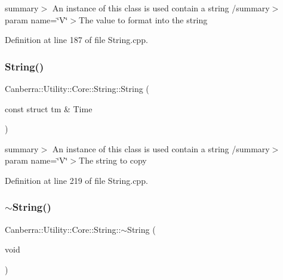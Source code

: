 summary$>$ An instance of this class is used contain a string /summary$>$ param name=\char`\"{}\+V\char`\"{}$>$The value to format into the string

Definition at line 187 of file String.\+cpp.

\mbox{\label{class_canberra_1_1_utility_1_1_core_1_1_string_a97efa34d4537218e59fdb3d0010d12ef_a97efa34d4537218e59fdb3d0010d12ef}} 
\subsubsection{\texorpdfstring{String()}{String()}\hspace{0.1cm}{\footnotesize\ttfamily [6/6]}}
{\footnotesize\ttfamily Canberra\+::\+Utility\+::\+Core\+::\+String\+::\+String (\begin{DoxyParamCaption}\item[{const struct tm \&}]{Time }\end{DoxyParamCaption})\hspace{0.3cm}{\ttfamily [explicit]}}

summary$>$ An instance of this class is used contain a string /summary$>$ param name=\char`\"{}\+V\char`\"{}$>$The string to copy

Definition at line 219 of file String.\+cpp.

\mbox{\label{class_canberra_1_1_utility_1_1_core_1_1_string_a98e04233ef897666c11a08a6466879e4_a98e04233ef897666c11a08a6466879e4}} 
\subsubsection{\texorpdfstring{$\sim$\+String()}{~String()}}
{\footnotesize\ttfamily Canberra\+::\+Utility\+::\+Core\+::\+String\+::$\sim$\+String (\begin{DoxyParamCaption}\item[{void}]{ }\end{DoxyParamCaption})\hspace{0.3cm}{\ttfamily [virtual]}}

